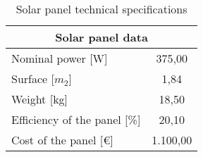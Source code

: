 \begin{table}[h]
\centering
\begin{tabular}{|l|c|}
\hline
\multicolumn{2}{|c|}{\cellcolor{bluepoli!40}Solar panel data} \\
\hline
Nominal power {[}W{]}                     & 375,00           \\
\hline
Surface {[}$m_2${]}                       & 1,84             \\
Weight {[}kg{]}                           & 18,50            \\
\hline
Efficiency of the panel {[}\%{]}          & 20,10            \\
\hline
Cost of the panel {[}€{]}                 & 1.100,00        \\
\hline
\end{tabular}
\caption{Solar panel technical specifications}
\label{tab:pvdata}
\end{table}